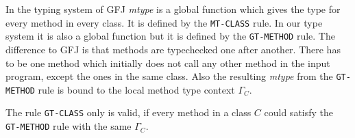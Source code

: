 In the typing system of GFJ \textit{mtype} is a global function which gives the type for every method in every class.
It is defined by the \texttt{MT-CLASS} rule.
In our type system it is also a global function but it is defined by the \texttt{GT-METHOD} rule.
The difference to GFJ is that methods are typechecked one after another.
There has to be one method which initially does not call any other method in the input program,
except the ones in the same class.
Also the resulting \textit{mtype} from the \texttt{GT-METHOD} rule is bound to the local method type context $\Gamma_C$.

The rule \texttt{GT-CLASS} only is valid, if every method in a class $C$ could satisfy the \texttt{GT-METHOD} rule with the same $\Gamma_C$.



